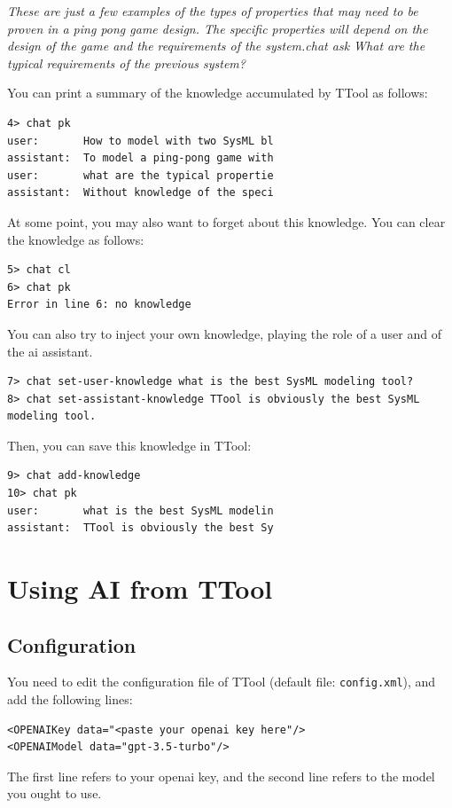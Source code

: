 \documentclass[12pt]{article}
\begin{document}
\textit{These are just a few examples of the types of properties that may need to be proven in a ping pong game design. The specific properties will depend on the design of the game and the requirements of the system.chat ask What are the typical requirements of the previous system?}


You can print a summary of the knowledge accumulated by TTool as follows:
\begin{lstlisting}
4> chat pk
user:		How to model with two SysML bl
assistant:	To model a ping-pong game with
user:		what are the typical propertie
assistant:	Without knowledge of the speci
\end{lstlisting}

At some point, you may also want to forget about this knowledge. You can clear the knowledge as follows:

\begin{lstlisting}
5> chat cl
6> chat pk
Error in line 6: no knowledge
\end{lstlisting}  

You can also try to inject your own knowledge, playing the role of a user and of the ai assistant.
\begin{lstlisting}
7> chat set-user-knowledge what is the best SysML modeling tool?
8> chat set-assistant-knowledge TTool is obviously the best SysML modeling tool.
\end{lstlisting}  
Then, you can save this knowledge in TTool:
\begin{lstlisting}
9> chat add-knowledge
10> chat pk   
user:		what is the best SysML modelin
assistant:	TTool is obviously the best Sy
\end{lstlisting}  


\newpage
\section{Using AI from TTool}

\subsection{Configuration}
You need to edit the configuration file of TTool (default file: \texttt{config.xml}), and add the following lines:
\begin{lstlisting}
<OPENAIKey data="<paste your openai key here"/>
<OPENAIModel data="gpt-3.5-turbo"/>
\end{lstlisting}  
The first line refers to your openai key, and the second line refers to the model you ought to use.
\end{document}
